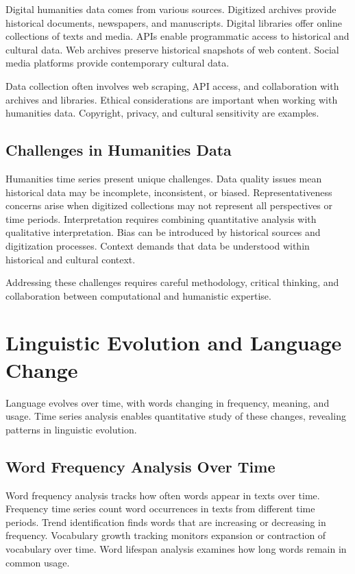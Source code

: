 Digital humanities data comes from various sources. Digitized archives provide historical documents, newspapers, and manuscripts. Digital libraries offer online collections of texts and media. APIs enable programmatic access to historical and cultural data. Web archives preserve historical snapshots of web content. Social media platforms provide contemporary cultural data.

Data collection often involves web scraping, API access, and collaboration with archives and libraries. Ethical considerations are important when working with humanities data. Copyright, privacy, and cultural sensitivity are examples.

\subsection{Challenges in Humanities Data}

Humanities time series present unique challenges. Data quality issues mean historical data may be incomplete, inconsistent, or biased. Representativeness concerns arise when digitized collections may not represent all perspectives or time periods. Interpretation requires combining quantitative analysis with qualitative interpretation. Bias can be introduced by historical sources and digitization processes. Context demands that data be understood within historical and cultural context.

Addressing these challenges requires careful methodology, critical thinking, and collaboration between computational and humanistic expertise.

\section{Linguistic Evolution and Language Change}

Language evolves over time, with words changing in frequency, meaning, and usage. Time series analysis enables quantitative study of these changes, revealing patterns in linguistic evolution.

\subsection{Word Frequency Analysis Over Time}

Word frequency analysis tracks how often words appear in texts over time. Frequency time series count word occurrences in texts from different time periods. Trend identification finds words that are increasing or decreasing in frequency. Vocabulary growth tracking monitors expansion or contraction of vocabulary over time. Word lifespan analysis examines how long words remain in common usage.

